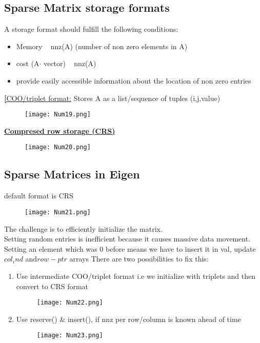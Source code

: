 \documentclass[8pt]{extreport}
\begin{document}
\subsection{Sparse Matrix storage formats}

A storage format should fulfill the following conditions:
\begin{itemize}
\item Memory ~ nnz(A) (number of non zero elements in A)
\item cost (A$\cdot$ vector) ~ nnz(A)
\item provide easily accessible information about the location of non zero entries
\end{itemize}

\underline{\textbf[{COO/triplet format:}} Stores A as a list/sequence of tuples (i,j,value)

\begin{figure}[H]
\centering
\texttt{[image: Num19.png]}
\end{figure}

\underline{\textbf{Compresed row storage (CRS)}}
\begin{figure}[H]
\centering
\texttt{[image: Num20.png]}
\end{figure}

\subsection{Sparse Matrices in Eigen}

default format is CRS
\begin{figure}[H]
\centering
\texttt{[image: Num21.png]}
\end{figure}
The challenge is to efficiently initialize the matrix.\\
Setting random entries is inefficient because it causes massive data movement. Setting an element which was 0 before means we have to insert it in val, update $col_ind$ and$row-ptr$ arrays
There are two possibilities to fix this:
\begin{enumerate}
\item Use intermediate COO/triplet format i.e we initialize with triplets and then convert to CRS format
\begin{figure}[H]
\centering
\texttt{[image: Num22.png]}
\end{figure}
\item Use reserve() $\&$ insert(), if nnz per row/column is known ahead of time
\begin{figure}[H]
\centering
\texttt{[image: Num23.png]}
\end{figure}
\end{enumerate}
\end{document}
